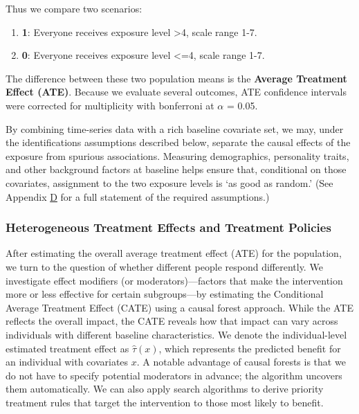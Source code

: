 \documentclass[
  single column]{article}
\providecommand{\tightlist}{%
  \setlength{\itemsep}{0pt}\setlength{\parskip}{0pt}}
\begin{document}
Thus we compare two scenarios:

\begin{enumerate}
\def\labelenumi{\arabic{enumi}.}
\tightlist
\item
  \textbf{1}: Everyone receives exposure level \textgreater4, scale
  range 1-7.
\item
  \textbf{0}: Everyone receives exposure level \textless=4, scale range
  1-7.
\end{enumerate}

The difference between these two population means is the \textbf{Average
Treatment Effect (ATE)}. Because we evaluate several outcomes, ATE
confidence intervals were corrected for multiplicity with bonferroni at
\(\alpha\) = 0.05.

By combining time-series data with a rich baseline covariate set, we
may, under the identifications assumptions described below, separate the
causal effects of the exposure from spurious associations. Measuring
demographics, personality traits, and other background factors at
baseline helps ensure that, conditional on those covariates, assignment
to the two exposure levels is `as good as random.' (See Appendix
\hyperref[appendix-assumptions_grf]{D} for a full statement of the
required assumptions.)

\subsubsection{Heterogeneous Treatment Effects and Treatment
Policies}\label{heterogeneous-treatment-effects-and-treatment-policies}

After estimating the overall average treatment effect (ATE) for the
population, we turn to the question of whether different people respond
differently. We investigate effect modifiers (or moderators)---factors
that make the intervention more or less effective for certain
subgroups---by estimating the Conditional Average Treatment Effect
(CATE) using a causal forest approach. While the ATE reflects the
overall impact, the CATE reveals how that impact can vary across
individuals with different baseline characteristics. We denote the
individual-level estimated treatment effect as \(\hat{\tau}(x)\), which
represents the predicted benefit for an individual with covariates
\(x\). A notable advantage of causal forests is that we do not have to
specify potential moderators in advance; the algorithm uncovers them
automatically. We can also apply search algorithms to derive priority
treatment rules that target the intervention to those most likely to
benefit.
\end{document}
